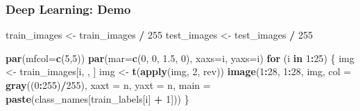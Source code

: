 \documentclass[
  shownotes,
  xcolor={svgnames},
  hyperref={colorlinks,citecolor=DarkBlue,linkcolor=DarkRed,urlcolor=DarkBlue}
  , aspectratio=169]{beamer}
\newenvironment{Shaded}{\begin{snugshade}}{\end{snugshade}}
\newcommand{\ControlFlowTok}[1]{\textcolor[rgb]{0.13,0.29,0.53}{\textbf{#1}}}
\newcommand{\DataTypeTok}[1]{\textcolor[rgb]{0.13,0.29,0.53}{#1}}
\newcommand{\DecValTok}[1]{\textcolor[rgb]{0.00,0.00,0.81}{#1}}
\newcommand{\FloatTok}[1]{\textcolor[rgb]{0.00,0.00,0.81}{#1}}
\newcommand{\KeywordTok}[1]{\textcolor[rgb]{0.13,0.29,0.53}{\textbf{#1}}}
\newcommand{\NormalTok}[1]{#1}
\newcommand{\OperatorTok}[1]{\textcolor[rgb]{0.81,0.36,0.00}{\textbf{#1}}}
\newcommand{\StringTok}[1]{\textcolor[rgb]{0.31,0.60,0.02}{#1}}
\begin{document}
\begin{frame}[fragile]
\frametitle{Deep Learning: Demo}

\begin{Shaded}
\begin{Highlighting}[]
\NormalTok{train\_images \textless{}{-}}\StringTok{ }\NormalTok{train\_images }\OperatorTok{/}\StringTok{ }\DecValTok{255}
\NormalTok{test\_images \textless{}{-}}\StringTok{ }\NormalTok{test\_images }\OperatorTok{/}\StringTok{ }\DecValTok{255}
\end{Highlighting}
\end{Shaded}

\begin{Shaded}
\begin{Highlighting}[]
\KeywordTok{par}\NormalTok{(}\DataTypeTok{mfcol=}\KeywordTok{c}\NormalTok{(}\DecValTok{5}\NormalTok{,}\DecValTok{5}\NormalTok{))}
\KeywordTok{par}\NormalTok{(}\DataTypeTok{mar=}\KeywordTok{c}\NormalTok{(}\DecValTok{0}\NormalTok{, }\DecValTok{0}\NormalTok{, }\FloatTok{1.5}\NormalTok{, }\DecValTok{0}\NormalTok{), }\DataTypeTok{xaxs=}\StringTok{\textquotesingle{}i\textquotesingle{}}\NormalTok{, }\DataTypeTok{yaxs=}\StringTok{\textquotesingle{}i\textquotesingle{}}\NormalTok{)}
\ControlFlowTok{for}\NormalTok{ (i }\ControlFlowTok{in} \DecValTok{1}\OperatorTok{:}\DecValTok{25}\NormalTok{) \{ }
\NormalTok{  img \textless{}{-}}\StringTok{ }\NormalTok{train\_images[i, , ]}
\NormalTok{  img \textless{}{-}}\StringTok{ }\KeywordTok{t}\NormalTok{(}\KeywordTok{apply}\NormalTok{(img, }\DecValTok{2}\NormalTok{, rev)) }
  \KeywordTok{image}\NormalTok{(}\DecValTok{1}\OperatorTok{:}\DecValTok{28}\NormalTok{, }\DecValTok{1}\OperatorTok{:}\DecValTok{28}\NormalTok{, img, }\DataTypeTok{col =} \KeywordTok{gray}\NormalTok{((}\DecValTok{0}\OperatorTok{:}\DecValTok{255}\NormalTok{)}\OperatorTok{/}\DecValTok{255}\NormalTok{), }\DataTypeTok{xaxt =} \StringTok{\textquotesingle{}n\textquotesingle{}}\NormalTok{, }\DataTypeTok{yaxt =} \StringTok{\textquotesingle{}n\textquotesingle{}}\NormalTok{,}
        \DataTypeTok{main =} \KeywordTok{paste}\NormalTok{(class\_names[train\_labels[i] }\OperatorTok{+}\StringTok{ }\DecValTok{1}\NormalTok{]))}
\NormalTok{\}}
\end{Highlighting}
\end{Shaded}

\end{frame}
\end{document}
